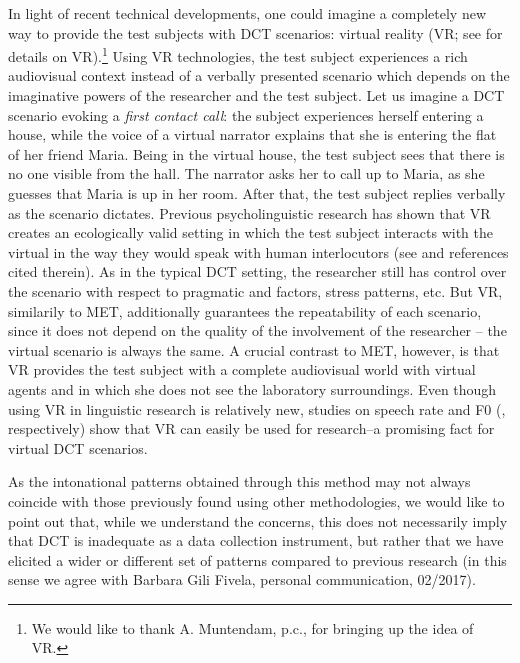 \documentclass[output=paper]{LSP/langsci}
\begin{document}
In light of recent technical developments, one could imagine a completely new way to provide the test subjects with DCT scenarios: virtual reality (VR; see \citealt{Fox.2009} for details on VR).\footnote{We would like to thank A. Muntendam, p.c., for bringing up the idea of VR.} Using VR technologies, the test subject experiences a rich audiovisual context instead of a verbally presented scenario which depends on the imaginative powers of the researcher and the test subject. Let us imagine a DCT scenario evoking a \textit{first contact call}: the subject experiences herself entering a house, while the voice of a virtual narrator explains that she is entering the flat of her friend Maria. Being in the virtual house, the test subject sees that there is no one visible from the hall. The narrator asks her to call up to Maria, as she guesses that Maria is up in her room. After that, the test subject replies verbally as the scenario dictates. 
Previous psycholinguistic research has shown that VR creates an ecologically valid setting in which the test subject interacts with the virtual  in the way they would speak with human interlocutors (see \citealt{Heyselaar.2017,PEETERS.2017} and references cited therein). As in the typical DCT setting, the researcher still has control over the scenario with respect to pragmatic and  factors, stress patterns, etc. But VR, similarily to MET, additionally guarantees the repeatability of each scenario, since it does not depend on the quality of the involvement of the researcher – the virtual scenario is always the same. A crucial contrast to MET, however, is that VR provides the test subject with a complete audiovisual world with virtual agents and in which she does not see the laboratory surroundings. Even though using VR in linguistic research is relatively new, studies on speech rate and F0 (\citealt{Gijssels.2015,StaumCasasanto.2010}, respectively) show that VR can easily be used for  research--a promising fact for virtual DCT scenarios.

As the intonational patterns obtained through this method may not always coincide with those previously found using other methodologies, we would like to point out that, while we understand the concerns, this does not necessarily imply that DCT is inadequate as a data collection instrument, but rather that we have elicited a wider or different set of patterns compared to previous research (in this sense we agree with Barbara Gili Fivela, personal communication, 02/2017).
\end{document}

